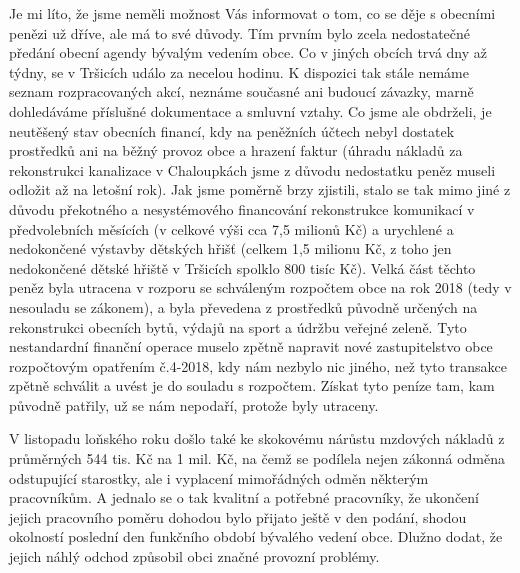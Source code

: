 \documentclass{article}
\begin{document}
\begin{multicols}{2}
{Je mi líto, že jsme neměli možnost Vás informovat o tom, co se děje s obecními penězi už dříve, ale má to své důvody. Tím prvním bylo zcela nedostatečné předání obecní agendy bývalým vedením obce. Co v jiných obcích trvá dny až týdny, se v Tršicích událo za necelou hodinu. K dispozici tak stále nemáme seznam rozpracovaných akcí, neznáme současné ani budoucí závazky, marně dohledáváme příslušné dokumentace a smluvní vztahy. Co jsme ale obdrželi, je neutěšený stav obecních financí, kdy na peněžních účtech nebyl dostatek prostředků ani na běžný provoz obce a hrazení faktur (úhradu nákladů za rekonstrukci kanalizace v Chaloupkách jsme z důvodu nedostatku peněz museli odložit až na letošní rok). Jak jsme poměrně brzy zjistili, stalo se tak mimo jiné z důvodu překotného a nesystémového financování rekonstrukce komunikací v předvolebních měsících (v celkové výši cca 7,5 milionů Kč) a urychlené a nedokončené výstavby dětských hřišť (celkem 1,5 milionu Kč, z toho jen nedokončené dětské hřiště v Tršicích spolklo 800 tisíc Kč). Velká část těchto peněz byla utracena v rozporu se schváleným rozpočtem obce na rok 2018 (tedy v nesouladu se zákonem), a byla převedena z prostředků původně určených na rekonstrukci obecních bytů, výdajů na sport a údržbu veřejné zeleně. Tyto nestandardní finanční operace muselo zpětně napravit nové zastupitelstvo obce rozpočtovým opatřením č.4-2018, kdy nám nezbylo nic jiného, než tyto transakce zpětně schválit a uvést je do souladu s rozpočtem. Získat tyto peníze tam, kam původně patřily, už se nám nepodaří, protože byly utraceny.

V listopadu loňského roku došlo také ke skokovému nárůstu mzdových nákladů z průměrných 544 tis. Kč na 1 mil. Kč, na čemž se podílela nejen zákonná odměna odstupující starostky, ale i vyplacení mimořádných odměn některým pracovníkům. A jednalo se o tak kvalitní a potřebné pracovníky, že ukončení jejich pracovního poměru dohodou bylo přijato ještě v den podání, shodou okolností poslední den funkčního období bývalého vedení obce. Dlužno dodat, že jejich náhlý odchod způsobil obci značné provozní problémy.

}
\end{multicols}
\end{document}
